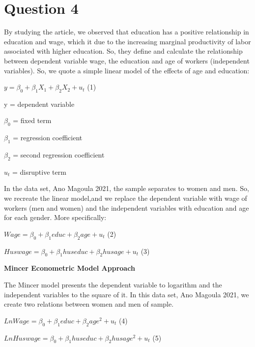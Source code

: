 \documentclass[10pt,towside,a4paper]{article}
\begin{document}
	
	\section*{Question 4}
	\vspace {0.5\baselineskip}
	
	By studying the article, we observed that education has a positive relationship in education and wage, which it due to the increasing marginal productivity of labor associated with higher education. So, they define and calculate the relationship between dependent variable wage, the education and age of workers (independent variables). So, we quote a simple linear model of the effects of age and education: 
	\vspace {0.5\baselineskip}

\begin{Center}
\large $y = \beta_0 + \beta_1  X_1 + \beta_2 X_2 + u_t$ (1)
\end{Center}
	\vspace {0.5\baselineskip}

y = dependent variable
	\vspace {0.5\baselineskip}

$\beta_0$ = fixed term
	\vspace {0.5\baselineskip}
	
$\beta_1$ = regression coefficient
	\vspace {0.5\baselineskip}
	
$\beta_2$ = second regression coefficient
	\vspace {0.5\baselineskip}

$u_t$ = disruptive term
	\vspace {0.5\baselineskip}
	
	In the data set, Ano Magoula 2021, the sample separates to women and men. So, we recreate the linear model,and we replace the dependent variable with wage of workers (men and women) and the independent variables with education and age for each gender. More specifically:
	\vspace {0.5\baselineskip}

\begin{Center}
\large	$Wage = \beta_0 + \beta_1 educ + \beta_2 age + u_t$  (2)
	\vspace {0.5\baselineskip}

\large	$Huswage = \beta_0 + \beta_1 huseduc + \beta_2 husage + u_t$  (3)
	\vspace {0.5\baselineskip}
\end{Center}

\large\textbf{Mincer Econometric Model Approach}
	\vspace {0.5\baselineskip}

	The Mincer model presents the dependent variable to logarithm and the independent variables to the square of it. In this data set, Ano Magoula 2021, we create two relations between women and men of sample.
	\vspace {0.5\baselineskip}
	
\begin{Center}
\large $LnWage = \beta_0 + \beta_1 educ + \beta_2 age^{2} + u_t$ 	(4)
	\vspace {0.5\baselineskip}

\large $LnHuswage = \beta_0 + \beta_1 huseduc + \beta_2 husage^{2} + u_t$ 	(5)
	\vspace {0.5\baselineskip}
\end{Center}
\end{document}
